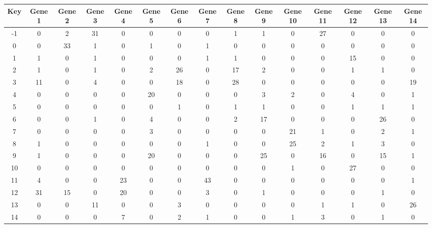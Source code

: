 \begin{tabular}{|c|c|c|c|c|c|c|c|c|c|c|c|c|c|c|}
\hline
Key & Gene 1 & Gene 2 & Gene 3 & Gene 4 & Gene 5 & Gene 6 & Gene 7 & Gene 8 & Gene 9 & Gene 10 & Gene 11 & Gene 12 & Gene 13 & Gene 14 \\
\hline
-1 & 0 & 2 & 31 & 0 & 0 & 0 & 0 & 1 & 1 & 0 & 27 & 0 & 0 & 0 \\
0 & 0 & 33 & 1 & 0 & 1 & 0 & 1 & 0 & 0 & 0 & 0 & 0 & 0 & 0 \\
1 & 1 & 0 & 1 & 0 & 0 & 0 & 1 & 1 & 0 & 0 & 0 & 15 & 0 & 0 \\
2 & 1 & 0 & 1 & 0 & 2 & 26 & 0 & 17 & 2 & 0 & 0 & 1 & 1 & 0 \\
3 & 11 & 0 & 4 & 0 & 0 & 18 & 0 & 28 & 0 & 0 & 0 & 0 & 0 & 19 \\
4 & 0 & 0 & 0 & 0 & 20 & 0 & 0 & 0 & 3 & 2 & 0 & 4 & 0 & 1 \\
5 & 0 & 0 & 0 & 0 & 0 & 1 & 0 & 1 & 1 & 0 & 0 & 1 & 1 & 1 \\
6 & 0 & 0 & 1 & 0 & 4 & 0 & 0 & 2 & 17 & 0 & 0 & 0 & 26 & 0 \\
7 & 0 & 0 & 0 & 0 & 3 & 0 & 0 & 0 & 0 & 21 & 1 & 0 & 2 & 1 \\
8 & 1 & 0 & 0 & 0 & 0 & 0 & 1 & 0 & 0 & 25 & 2 & 1 & 3 & 0 \\
9 & 1 & 0 & 0 & 0 & 20 & 0 & 0 & 0 & 25 & 0 & 16 & 0 & 15 & 1 \\
10 & 0 & 0 & 0 & 0 & 0 & 0 & 0 & 0 & 0 & 1 & 0 & 27 & 0 & 0 \\
11 & 4 & 0 & 0 & 23 & 0 & 0 & 43 & 0 & 0 & 0 & 0 & 0 & 0 & 1 \\
12 & 31 & 15 & 0 & 20 & 0 & 0 & 3 & 0 & 1 & 0 & 0 & 0 & 1 & 0 \\
13 & 0 & 0 & 11 & 0 & 0 & 3 & 0 & 0 & 0 & 0 & 1 & 1 & 0 & 26 \\
14 & 0 & 0 & 0 & 7 & 0 & 2 & 1 & 0 & 0 & 1 & 3 & 0 & 1 & 0 \\
\hline
\end{tabular}